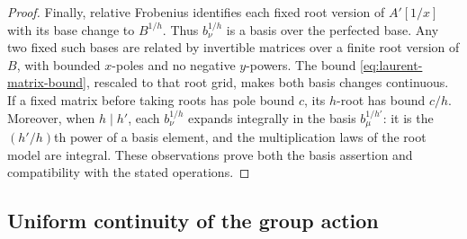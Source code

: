 \begin{proof}
Finally, relative Frobenius identifies each fixed root version of
$A'[1/x]$ with its base change to $B^{1/h}$.  Thus
$b_\nu^{1/h}$ is a basis over the perfected base.  Any two fixed
such bases are related by invertible matrices over a finite root
version of $B$, with bounded $x$-poles and no negative $y$-powers.
The bound \cref{eq:laurent-matrix-bound}, rescaled to that root grid,
makes both basis changes continuous.  If a fixed matrix before
taking roots has pole bound $c$, its $h$-root has bound $c/h$.
Moreover, when $h\mid h'$, each $b_\nu^{1/h}$ expands integrally
in the basis $b_\mu^{1/h'}$: it is the $(h'/h)$th power of a basis
element, and the multiplication laws of the root model are integral.
These observations prove both the basis assertion and compatibility
with the stated operations.
\end{proof}

\subsection{Uniform continuity of the group action}


